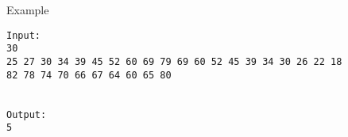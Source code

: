 Example
\begin{verbatim}
Input:
30
25 27 30 34 39 45 52 60 69 79 69 60 52 45 39 34 30 26 22 18
82 78 74 70 66 67 64 60 65 80


Output:
5
\end{verbatim}